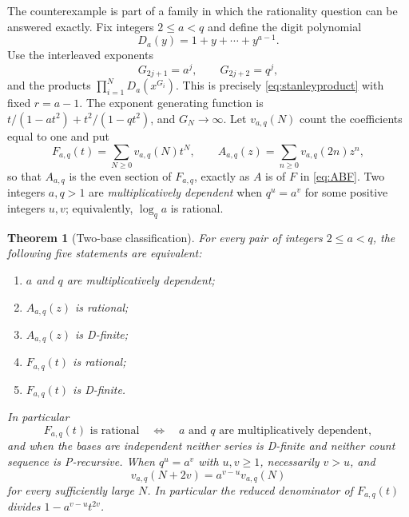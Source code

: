 \documentclass[11pt,letterpaper]{article}
\numberwithin{equation}{section}
\newtheorem{theorem}{Theorem}[section]
\theoremstyle{definition}
\theoremstyle{remark}
\begin{document}
The counterexample is part of a family in which the rationality question
can be answered exactly. Fix integers $2\le a<q$ and define the digit
polynomial
\begin{equation}\label{eq:digitpoly}
 D_a(y)=1+y+\cdots+y^{a-1}.
\end{equation}
Use the interleaved exponents
\begin{equation}\label{eq:generalexponents}
 G_{2j+1}=a^j,\qquad G_{2j+2}=q^j,
\end{equation}
and the products $\prod_{i=1}^N D_a(x^{G_i})$. This is precisely
\eqref{eq:stanleyproduct} with fixed $r=a-1$. The exponent generating
function is $t/(1-at^2)+t^2/(1-qt^2)$, and $G_N\to\infty$.
Let $v_{a,q}(N)$ count the coefficients equal to one and put
\begin{equation}\label{eq:generalseries}
 F_{a,q}(t)=\sum_{N\ge0}v_{a,q}(N)t^N,
 \qquad
 A_{a,q}(z)=\sum_{n\ge0}v_{a,q}(2n)z^n,
\end{equation}
so that $A_{a,q}$ is the even section of $F_{a,q}$, exactly as $A$ is of
$F$ in \eqref{eq:ABF}. Two integers $a,q>1$ are \emph{multiplicatively
dependent} when $q^u=a^v$ for some positive integers $u,v$; equivalently,
$\log_q a$ is rational.

\begin{theorem}[Two-base classification]\label{thm:classification}
For every pair of integers $2\le a<q$, the following five statements are
equivalent:
\begin{enumerate}[label=\textup{(\roman*)},leftmargin=2.4em]
\item $a$ and $q$ are multiplicatively dependent;
\item $A_{a,q}(z)$ is rational;
\item $A_{a,q}(z)$ is D-finite;
\item $F_{a,q}(t)$ is rational;
\item $F_{a,q}(t)$ is D-finite.
\end{enumerate}
In particular
\begin{equation}\label{eq:classification}
 F_{a,q}(t)\text{ is rational}
 \quad\Longleftrightarrow\quad
 a\text{ and }q\text{ are multiplicatively dependent},
\end{equation}
and when the bases are independent neither series is D-finite and neither
count sequence is P-recursive.
When $q^u=a^v$ with $u,v\ge1$, necessarily $v>u$, and
\begin{equation}\label{eq:eventualdependent}
 v_{a,q}(N+2v)=a^{v-u}v_{a,q}(N)
\end{equation}
for every sufficiently large $N$. In particular the reduced denominator
of $F_{a,q}(t)$ divides $1-a^{v-u}t^{2v}$.
\end{theorem}
\end{document}
